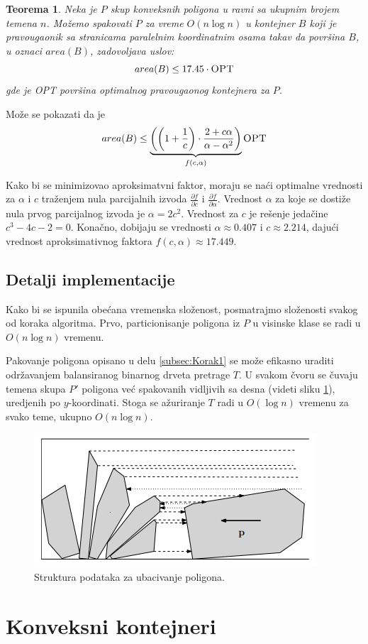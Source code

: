 \documentclass[a4paper]{article}
\theoremstyle{plain}
\newtheorem{thm}{Teorema}[section] %
\theoremstyle{definition}
\begin{document}
\begin{thm}
    Neka je $P$ skup konveksnih poligona u ravni sa ukupnim brojem temena $n$. Mo\v{z}emo spakovati $P$ za vreme $O(n\log{}n)$ u kontejner $B$ koji je pravougaonik sa stranicama paralelnim koordinatnim osama takav da povr\v{s}ina $B$, u oznaci $area(B)$, zadovoljava uslov: $$area(B) \leq 17.45 \cdot \textsc{OPT}$$ gde je \textsc{OPT} povr\v{s}ina optimalnog pravougaonog kontejnera za $P$. 
\end{thm}

Mo\v{z}e se pokazati da je $$area(B) \leq \underbrace{\left(\left(1+\frac{1}{c}\right) \cdot \frac{2 + c\alpha}{\alpha - \alpha^{2}}\right)}_{f(c,\alpha)} \textsc{OPT}$$ 

Kako bi se minimizovao aproksimatvni faktor, moraju se na\'c{}i optimalne vrednosti za $\alpha$ i $c$ tra\v{z}enjem nula parcijalnih izvoda $\frac{\partial f}{\partial c}$ i $\frac{\partial f}{\partial \alpha}$. Vrednost $\alpha$ za koje se dosti\v{z}e nula prvog parcijalnog izvoda je $\alpha = 2c^{2}$. Vrednost za $c$ je re\v{s}enje jeda\v{c}ine $c^{3} - 4c - 2 = 0$. Kona\v{c}no, dobijaju se vrednosti $\alpha \approx 0.407$ i $c \approx 2.214$, daju\'c{}i vrednost aproksimativnog faktora $f(c, \alpha) \approx 17.449$.


\subsection{Detalji implementacije}
\label{subsec:Implementacija}

Kako bi se ispunila obe\'c{}ana vremenska slo\v{z}enost, posmatrajmo slo\v{z}enosti svakog od koraka algoritma. Prvo, particionisanje poligona iz $P$ u visinske klase se radi u $O(n\log{}n)$ vremenu.

Pakovanje poligona opisano u delu \ref{subsec:Korak1} se mo\v{z}e efikasno uraditi odr\v{z}avanjem balansiranog binarnog drveta pretrage $T$. U svakom \v{c}voru se \v{c}uvaju temena skupa $P'$ poligona ve\'c{} spakovanih vidljivih sa desna (videti sliku \ref{fig2}), uredjenih po $y$-koordinati. Stoga se a\v{z}uriranje $T$ radi u $O(\log{}n)$ vremenu za svako teme, ukupno $O(n\log{}n)$. 

\begin{figure}[H]
    \centering
    \includegraphics[scale=0.7]{resources/fig2.PNG}
    \caption{Struktura podataka za ubacivanje poligona.}
    \label{fig2}
\end{figure}


\section{Konveksni kontejneri}
\label{sec:Konveksni}




\appendix



\end{document}
